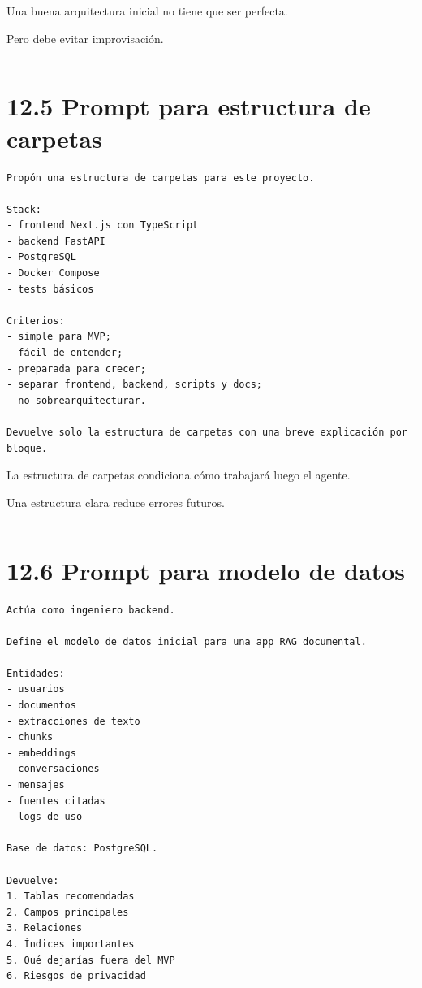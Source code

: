 Una buena arquitectura inicial no tiene que ser perfecta.

Pero debe evitar improvisación.

\begin{center}\rule{0.5\linewidth}{0.5pt}\end{center}

\section{12.5 Prompt para estructura de
carpetas}\label{prompt-para-estructura-de-carpetas}

\begin{lstlisting}
Propón una estructura de carpetas para este proyecto.

Stack:
- frontend Next.js con TypeScript
- backend FastAPI
- PostgreSQL
- Docker Compose
- tests básicos

Criterios:
- simple para MVP;
- fácil de entender;
- preparada para crecer;
- separar frontend, backend, scripts y docs;
- no sobrearquitecturar.

Devuelve solo la estructura de carpetas con una breve explicación por bloque.
\end{lstlisting}

La estructura de carpetas condiciona cómo trabajará luego el agente.

Una estructura clara reduce errores futuros.

\begin{center}\rule{0.5\linewidth}{0.5pt}\end{center}

\section{12.6 Prompt para modelo de
datos}\label{prompt-para-modelo-de-datos}

\begin{lstlisting}
Actúa como ingeniero backend.

Define el modelo de datos inicial para una app RAG documental.

Entidades:
- usuarios
- documentos
- extracciones de texto
- chunks
- embeddings
- conversaciones
- mensajes
- fuentes citadas
- logs de uso

Base de datos: PostgreSQL.

Devuelve:
1. Tablas recomendadas
2. Campos principales
3. Relaciones
4. Índices importantes
5. Qué dejarías fuera del MVP
6. Riesgos de privacidad
\end{lstlisting}

